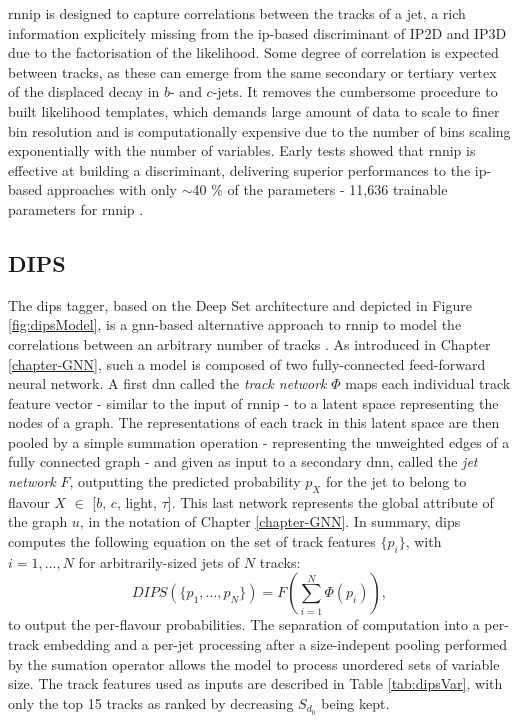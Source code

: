 \gls{rnnip} is designed to capture correlations between the tracks of a jet, a rich information explicitely missing from the \gls{ip}-based discriminant of IP2D and IP3D due to the factorisation of the likelihood. Some degree of correlation is expected between tracks, as these can emerge from the same secondary or tertiary vertex of the displaced decay in $b$- and $c$-jets. It removes the cumbersome procedure to built likelihood templates, which demands large amount of data to scale to finer bin resolution and is computationally expensive due to the number of bins scaling exponentially with the number of variables. Early tests showed that \gls{rnnip} is effective at building a discriminant, delivering superior performances to the \gls{ip}-based approaches with only $\sim$40 \% of the parameters - 11,636 trainable parameters for \gls{rnnip} \cite{Paganini:2289214}.

\subsection{DIPS}
The \gls{dips} tagger, based on the Deep Set architecture \cite{NIPS2017f22e4747} and depicted in Figure \ref{fig:dipsModel}, is a \gls{gnn}-based alternative approach to \gls{rnnip} to model the correlations between an arbitrary number of tracks \cite{ATL-PHYS-PUB-2020-014}. As introduced in Chapter \ref{chapter-GNN}, such a model is composed of two fully-connected feed-forward neural network. A first \gls{dnn} called the \textit{track network} $\Phi$ maps each individual track feature vector - similar to the input of \gls{rnnip} - to a latent space representing the nodes of a graph. The representations of each track in this latent space are then pooled by a simple summation operation - representing the unweighted edges of a fully connected graph - and given as input to a secondary \gls{dnn}, called the \textit{jet network} $F$, outputting the predicted probability $p_X$ for the jet to belong to flavour $X$ $\in$ [$b$, $c$, light, $\tau$]. This last network represents the global attribute of the graph $u$, in the notation of Chapter \ref{chapter-GNN}. 
In summary, \gls{dips} computes the following equation on the set of track features $\{ p_i \}$, with $i = 1, ..., N$ for arbitrarily-sized jets of $N$ tracks:
\begin{equation}
  DIPS( \{p_1, ..., p_N \} ) = F\left( \sum_{i=1}^N \Phi(p_i) \right),
\end{equation}
to output the per-flavour probabilities. The separation of computation into a per-track embedding and a per-jet processing after a size-indepent pooling performed by the sumation operator allows the model to process unordered sets of variable size. The track features used as inputs are described in Table \ref{tab:dipsVar}, with only the top 15 tracks as ranked by decreasing $S_{d_0}$ being kept.

